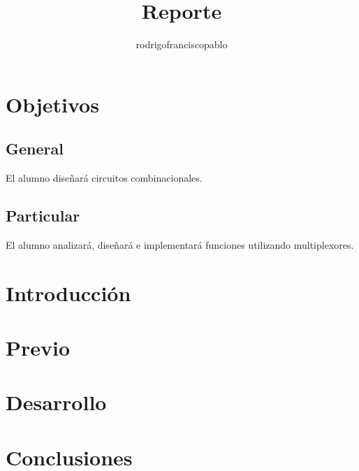 \documentclass{mylib/reporteConCalif}
\title{Reporte}
\author{rodrigofranciscopablo }
\begin{document}
\coverPage

\section{Objetivos}

\subsection{General}

El alumno diseñará circuitos combinacionales.

\subsection{Particular}

El alumno analizará, diseñará e implementará funciones utilizando multiplexores.

\section{Introducción}


\newpage
\section{Previo}

\newpage
\section{Desarrollo}


\section{Conclusiones}
\end{document}
